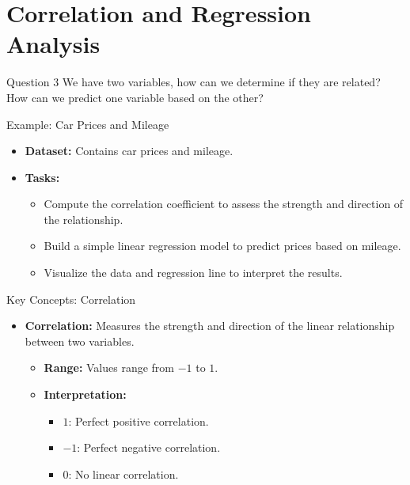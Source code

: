 \documentclass{beamer}
\begin{document}
\section{Correlation and Regression Analysis}

\begin{frame}{Question 3}
    We have two variables, how can we determine if they are related? How can we predict one variable based on the other?
\end{frame}

\begin{frame}{Example: Car Prices and Mileage}
    \begin{itemize}
        \item \textbf{Dataset:} Contains car prices and mileage.
        \item \textbf{Tasks:}
        \begin{itemize}
            \item Compute the correlation coefficient to assess the strength and direction of the relationship.
            \item Build a simple linear regression model to predict prices based on mileage.
            \item Visualize the data and regression line to interpret the results.
        \end{itemize}
    \end{itemize}
\end{frame}
    

\begin{frame}{Key Concepts: Correlation}
\begin{itemize}
    \item \textbf{Correlation:} Measures the strength and direction of the linear relationship between two variables.
    \begin{itemize}
        \item \textbf{Range:} Values range from $-1$ to $1$.
        \item \textbf{Interpretation:}
        \begin{itemize}
            \item $1$: Perfect positive correlation.
            \item $-1$: Perfect negative correlation.
            \item $0$: No linear correlation.
        \end{itemize}
    \end{itemize}
\end{itemize}
\end{frame}
\end{document}
